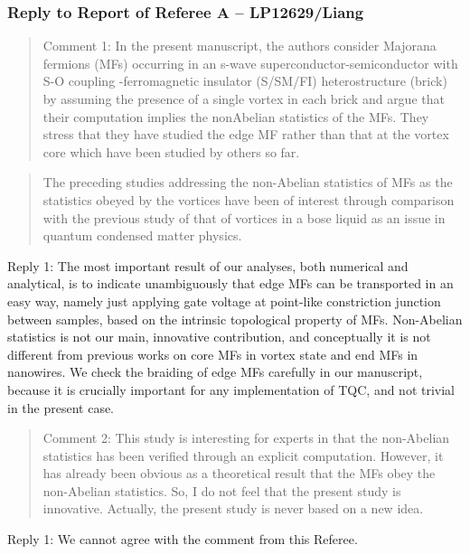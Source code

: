 \documentclass[11pt]{article}
\begin{document}
\hypertarget{reply-to-report-of-referee-a-lp12629liang}{%
\subsubsection{Reply to Report of Referee A --
LP12629/Liang}\label{reply-to-report-of-referee-a-lp12629liang}}

\begin{quote}
Comment 1: In the present manuscript, the authors consider Majorana
fermions (MFs) occurring in an s-wave superconductor-semiconductor with
S-O coupling -ferromagnetic insulator (S/SM/FI) heterostructure (brick)
by assuming the presence of a single vortex in each brick and argue that
their computation implies the nonAbelian statistics of the MFs. They
stress that they have studied the edge MF rather than that at the vortex
core which have been studied by others so far.
\end{quote}

\begin{quote}
The preceding studies addressing the non-Abelian statistics of MFs as
the statistics obeyed by the vortices have been of interest through
comparison with the previous study of that of vortices in a bose liquid
as an issue in quantum condensed matter physics.
\end{quote}

Reply 1: The most important result of our analyses, both numerical and
analytical, is to indicate unambiguously that edge MFs can be
transported in an easy way, namely just applying gate voltage at
point-like constriction junction between samples, based on the intrinsic
topological property of MFs. Non-Abelian statistics is not our main,
innovative contribution, and conceptually it is not different from
previous works on core MFs in vortex state and end MFs in nanowires. We
check the braiding of edge MFs carefully in our manuscript, because it
is crucially important for any implementation of TQC, and not trivial in
the present case.

\begin{quote}
Comment 2: This study is interesting for experts in that the non-Abelian
statistics has been verified through an explicit computation. However,
it has already been obvious as a theoretical result that the MFs obey
the non-Abelian statistics. So, I do not feel that the present study is
innovative. Actually, the present study is never based on a new idea.
\end{quote}

Reply 1: We cannot agree with the comment from this Referee.
\end{document}
